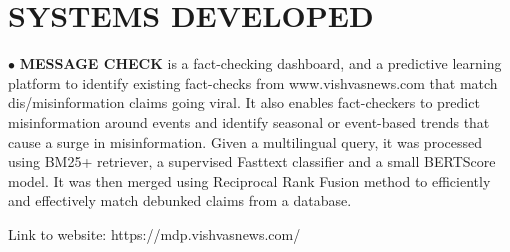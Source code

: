 \documentclass[paper=a4,fontsize=10pt]{scrartcl} %
\newcommand{\sepspace}{\vspace*{0.6em}}		%
\newcommand{\NewPart}[1]{\section*{\uppercase{#1}}}
\begin{document}
\NewPart{Systems Developed}{}

\vspace*{-1mm}
{
\small
    \noindent $\bullet$ \textbf{MESSAGE CHECK} is a fact-checking dashboard, and a predictive learning platform to identify existing fact-checks from www.vishvasnews.com that match dis/misinformation claims going viral. It also enables fact-checkers to predict misinformation around events and identify seasonal or event-based trends that cause a surge in misinformation. 
    Given a multilingual query, it was processed using BM25+ retriever, a supervised Fasttext classifier and a small BERTScore model. It was then merged using Reciprocal Rank Fusion method to efficiently and effectively match debunked claims from a database.

    \noindent Link to website: https://mdp.vishvasnews.com/ 
}
\vspace*{-1mm}
\end{document}
